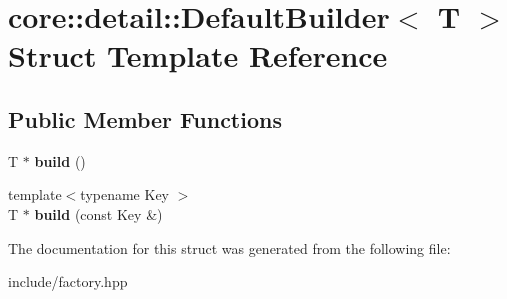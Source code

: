 \hypertarget{structcore_1_1detail_1_1_default_builder}{\section{core\-:\-:detail\-:\-:Default\-Builder$<$ T $>$ Struct Template Reference}
\label{structcore_1_1detail_1_1_default_builder}
}
\subsection*{Public Member Functions}
\begin{DoxyCompactItemize}
\item 
\hypertarget{structcore_1_1detail_1_1_default_builder_ac159d7e3475a870128514db68e0d8e08}{T $\ast$ {\bfseries build} ()}\label{structcore_1_1detail_1_1_default_builder_ac159d7e3475a870128514db68e0d8e08}

\item 
\hypertarget{structcore_1_1detail_1_1_default_builder_a2af0bb794fc2dbcd1fbbc77d74848940}{{\footnotesize template$<$typename Key $>$ }\\T $\ast$ {\bfseries build} (const Key \&)}\label{structcore_1_1detail_1_1_default_builder_a2af0bb794fc2dbcd1fbbc77d74848940}

\end{DoxyCompactItemize}


The documentation for this struct was generated from the following file\-:\begin{DoxyCompactItemize}
\item 
include/factory.\-hpp\end{DoxyCompactItemize}
